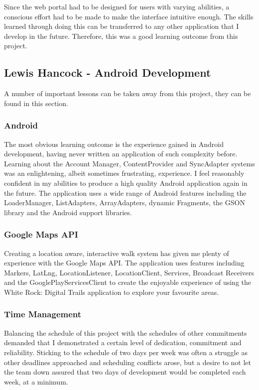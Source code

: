 \documentclass[11pt,a4paper]{report}
\begin{document}
Since the web portal had to be designed for users with varying abilities, a conscious effort had to be made to make the interface intuitive enough. The skills learned through doing this can be transferred to any other application that I develop in the future. Therefore, this was a good learning outcome from this project.

\subsection{Lewis Hancock - Android Development}
A number of important lessons can be taken away from this project, they can be found in this section.

\subsubsection{Android}
The most obvious learning outcome is the experience gained in Android development, having never written an application of such complexity before. Learning about the Account Manager, ContentProvider and SyncAdapter systems was an enlightening, albeit sometimes frustrating, experience. I feel reasonably confident in my abilities to produce a high quality Android application again in the future. The application uses a wide range of Android features including the LoaderManager, ListAdapters, ArrayAdapters, dynamic Fragments, the GSON library and the Android support libraries.

\subsubsection{Google Maps API}
Creating a location aware, interactive walk system has given me plenty of experience with the Google Maps API. The application uses features including Markers, LatLng, LocationListener, LocationClient, Services, Broadcast Receivers and the GooglePlayServicesClient to create the enjoyable experience of using the White Rock: Digital Trails application to explore your favourite areas.

\subsubsection{Time Management}
Balancing the schedule of this project with the schedules of other commitments demanded that I demonstrated a certain level of dedication, commitment and reliability. Sticking to the schedule of two days per week was often a struggle as other deadlines approached and scheduling conflicts arose, but a desire to not let the team down assured that two days of development would be completed each week, at a minimum. 
\end{document}
